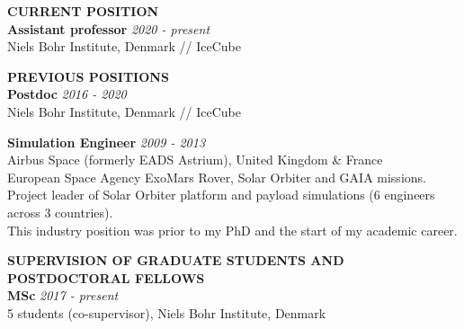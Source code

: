 \documentclass[a4paper,11pt]{article}
\renewcommand{\smallskip} {\vspace{0.1in}}
\begin{document}
%
%
\vspace{0.2cm}
\textbf{CURRENT POSITION ~~\hrulefill}\smallskip\\
%
{\bf Assistant professor} \hfill {\em 2020 - present} \\ 
Niels Bohr Institute, Denmark // IceCube

\vspace{0.2cm}
\textbf{PREVIOUS POSITIONS ~~\hrulefill}\smallskip\\
%
{\bf Postdoc} \hfill {\em 2016 - 2020} \\ 
Niels Bohr Institute, Denmark // IceCube

{\bf Simulation Engineer} \hfill {\em 2009 - 2013} \\ 
Airbus Space (formerly EADS Astrium), United Kingdom \& France\\
European Space Agency ExoMars Rover, Solar Orbiter and GAIA missions. \\
Project leader of Solar Orbiter platform and payload simulations (6 engineers across 3 countries). \\
This industry position was prior to my PhD and the start of my academic career. 

\vspace{0.2cm}
\textbf{SUPERVISION OF GRADUATE STUDENTS AND POSTDOCTORAL FELLOWS ~~\hrulefill}\smallskip\\
%
{\bf MSc} \hfill {\em 2017 - present} \\
5 students (co-supervisor), Niels Bohr Institute, Denmark
\end{document}
